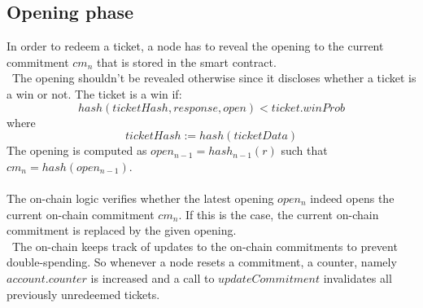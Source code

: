 \subsection{Opening phase}
In order to redeem a ticket, a node has to reveal the opening to the current commitment $cm_n$ that is stored in the smart contract. 
\\~The opening shouldn’t be revealed otherwise since it discloses whether a ticket is a win or not.
The ticket is a win if: $$hash( ticketHash, response, open ) <ticket.winProb$$ where $$ticketHash:=hash( ticketData )$$
The opening is computed as $open_{n-1} = hash_{n-1}(r)$ such that $cm_n=hash( open_{n-1})$. 
\\~\\The on-chain logic verifies whether the latest opening $open_n$ indeed opens the current on-chain commitment $cm_n$. 
If this is the case, the current on-chain commitment is replaced by the given opening. 
\\~The on-chain keeps track of updates to the on-chain commitments to prevent double-spending. 
So whenever a node resets a commitment, a counter, namely $account.counter$ is increased and a call to $updateCommitment$ invalidates all previously unredeemed tickets.








